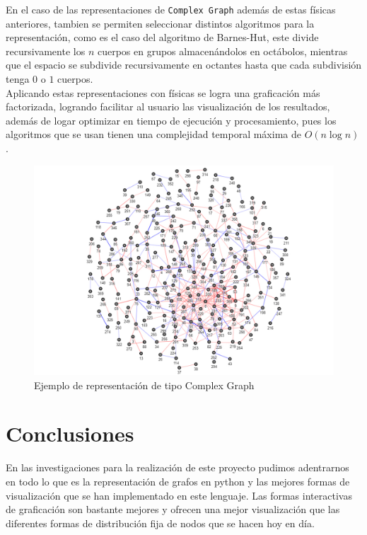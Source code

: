 \documentclass[a4paper,10pt,twocolumn]{article}
\begin{document}
En el caso de las representaciones de \texttt{Complex Graph} además de estas físicas anteriores, tambien se permiten seleccionar distintos algoritmos para la representación, como es el caso del algoritmo de Barnes-Hut, este divide recursivamente los $n$ cuerpos en grupos almacenándolos en octábolos, mientras que el espacio se subdivide recursivamente en octantes hasta que cada subdivisión tenga $0$ o $1$ cuerpos.\\



Aplicando estas representaciones con físicas se logra una graficación más factorizada, logrando facilitar al usuario las visualización
de los resultados, además de logar optimizar en tiempo de ejecución y procesamiento, pues los algoritmos que se usan tienen una complejidad temporal máxima de $O(n\log{n})$.\\

\begin{figure}[h!]%
\includegraphics[scale=0.25]{complex.jpg}
\caption{Ejemplo de representación de tipo Complex Graph}
\end{figure}

\section{Conclusiones}\label{sec:conc}

En las investigaciones para la realización de este proyecto pudimos adentrarnos en todo lo que es la representación de grafos en python y las mejores formas de visualización que se han implementado en este lenguaje. Las formas interactivas de graficación son bastante mejores y ofrecen una mejor visualización que las diferentes formas de distribución fija de nodos que se hacen hoy en día.\\
\end{document}
